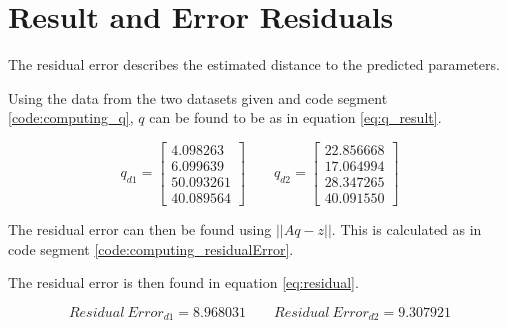 \section{Result and Error Residuals}
The residual error describes the estimated distance to the predicted parameters.



Using the data from the two datasets given and code segment \ref{code:computing_q}, $q$ can be found to be as in equation \ref{eq:q_result}.



        
        
 

\begin{equation}
q_{d1} = 
\left[
\begin{array}{c}
4.098263 \\
6.099639 \\
50.093261 \\
40.089564
\end{array}
\right]
% 
\qquad
% 
q_{d2} = 
\left[
\begin{array}{c}
22.856668 \\
17.064994 \\
28.347265 \\
40.091550
\end{array}
\right]
\label{eq:q_result}
\end{equation}

The residual error can then be found using $|| Aq - z ||$.
This is calculated as in code segment \ref{code:computing_residualError}.



The residual error is then found in equation \ref{eq:residual}.

\begin{equation}
Residual\ Error_{d1} = 8.968031 
% 
\qquad
% 
Residual\ Error_{d2} = 9.307921
\label{eq:residual}
\end{equation}

